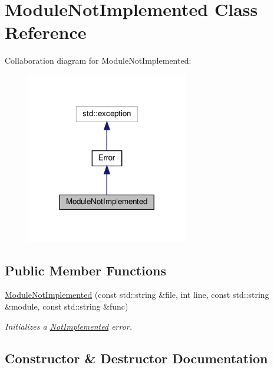 \hypertarget{classModuleNotImplemented}{}\section{Module\+Not\+Implemented Class Reference}
\label{classModuleNotImplemented}


Collaboration diagram for Module\+Not\+Implemented\+:
\nopagebreak
\begin{figure}[H]
\begin{center}
\leavevmode
\includegraphics[width=200pt]{classModuleNotImplemented__coll__graph}
\end{center}
\end{figure}
\subsection*{Public Member Functions}
\begin{DoxyCompactItemize}
\item 
\hyperlink{classModuleNotImplemented_adf169bb339dbebbd025eda534d58fd6f}{Module\+Not\+Implemented} (const std\+::string \&file, int line, const std\+::string \&module, const std\+::string \&func)
\begin{DoxyCompactList}\small\item\em Initializes a \hyperlink{classNotImplemented}{Not\+Implemented} error. \end{DoxyCompactList}\end{DoxyCompactItemize}


\subsection{Constructor \& Destructor Documentation}
\mbox{\label{classModuleNotImplemented_adf169bb339dbebbd025eda534d58fd6f}} 
